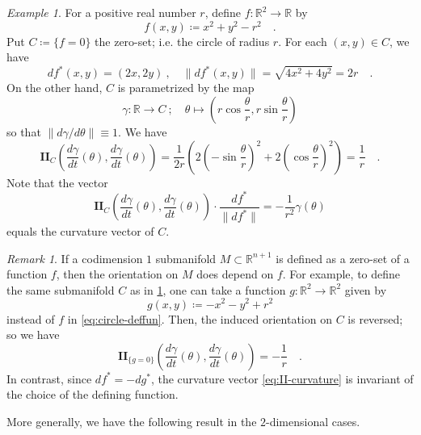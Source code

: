 \documentclass[pdftex,a4paper,12pt]{scrartcl}
\theoremstyle{plain}
\theoremstyle{definition}
\theoremstyle{remark}
\newtheorem{example}[theorem]{Example}
\newtheorem{remark}[theorem]{Remark}
\numberwithin{equation}{section}
\begin{document}
\begin{example}
\label{ex:II-on-circle}
For a positive real number $r$, define $f:\mathbb R^2\to\mathbb R$ by
\begin{equation}
\label{eq:circle-deffun}
f(x,y)\coloneqq x^2+y^2-r^2
\quad.
\end{equation}
Put $C\coloneqq\{f=0\}$ the zero-set; i.e. the circle of radius $r$.
For each $(x,y)\in C$, we have
\[
df^\ast(x,y) = (2x,2y)
\ ,\quad
\|df^\ast(x,y)\| = \sqrt{4x^2 + 4y^2} = 2r
\quad.
\]
On the other hand, $C$ is parametrized by the map
\[
\gamma:\mathbb R\to C
\ ;\quad \theta\mapsto \left(r\cos\frac\theta{r},r\sin\frac\theta{r}\right)
\]
so that $\|d\gamma/d\theta\|\equiv 1$.
We have
\[
\mathbf{II}_C\left(\frac{d\gamma}{dt}(\theta),\frac{d\gamma}{dt}(\theta)\right)
= \frac1{2r}\left(2\left(-\sin\frac\theta{r}\right)^2 + 2\left(\cos\frac\theta{r}\right)^2\right) = \frac1{r}
\quad.
\]
Note that the vector
\begin{equation}
\label{eq:II-curvature}
\mathbf{II}_C\left(\frac{d\gamma}{dt}(\theta),\frac{d\gamma}{dt}(\theta)\right)\cdot \frac{df^\ast}{\|df^\ast\|}
= -\frac{1}{r^2}\gamma(\theta)
\end{equation}
equals the curvature vector of $C$.
\end{example}

\begin{remark}
If a codimension $1$ submanifold $M\subset\mathbb R^{n+1}$ is defined as a zero-set of a function $f$, then the orientation on $M$ does depend on $f$.
For example, to define the same submanifold $C$ as in \cref{ex:II-on-circle}, one can take a function $g:\mathbb R^2\to\mathbb R^2$ given by
\[
g(x,y)\coloneqq -x^2-y^2+r^2
\]
instead of $f$ in \eqref{eq:circle-deffun}.
Then, the induced orientation on $C$ is reversed; so we have
\[
\mathbf{II}_{\{g=0\}}\left(\frac{d\gamma}{dt}(\theta),\frac{d\gamma}{dt}(\theta)\right)
= -\frac1{r}
\quad.
\]
In contrast, since $df^\ast = -dg^\ast$, the curvature vector \eqref{eq:II-curvature} is invariant of the choice of the defining function.
\end{remark}

More generally, we have the following result in the $2$-dimensional cases.
\end{document}
